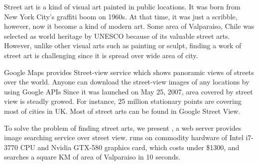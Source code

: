 

Street art is a kind of visual art painted in public locations.
It was born from New York City's graffiti boom on 1960s.
At that time, it was just a scribble, however, now it become a kind of modern art.
Some area of Valparaiso, Chile was selected as world heritage by UNESCO because of its valuable street arts.
However, unlike other visual arts such as painting or sculpt, finding a work of street art is challenging since it is spread over wide area of city.

Google Maps provides Street-view service\cite{streetview} which shows panoramic views of streets over the world.
Anyone can download the street-view images of any locations by using Google APIs
Since it was launched on May 25, 2007, area covered by street view is steadly growed. For instance, 25 million stationary points are covering most of cities in UK.
Most of street arts can be found in Google Street View.

To solve the problem of finding street arts, we present \name{}, a web server provides image searching service over street view.
\name{} runs on commodity hardware of Intel i7-3770 CPU and Nvidia GTX-580 graphics card, which costs under \$1300, and searches a square KM of area of Valparaiso in 10 seconds.
